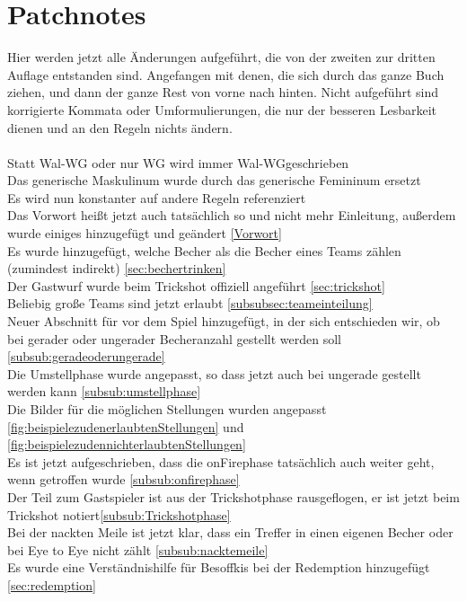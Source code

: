 \documentclass[a5paper, 12pt]{book}
\begin{document}
\chapter{Patchnotes}\label{chap:patchnotes}
Hier werden jetzt alle Änderungen aufgeführt, die von der zweiten zur dritten Auflage entstanden sind. Angefangen mit denen, die sich durch das ganze Buch ziehen, und dann der ganze Rest von vorne nach hinten. Nicht aufgeführt sind korrigierte Kommata oder Umformulierungen, die nur der besseren Lesbarkeit dienen und an den Regeln nichts ändern.\\\\
Statt Wal-WG oder nur WG wird immer Wal-WG\texttrademark geschrieben\\
Das generische Maskulinum wurde durch das generische Femininum ersetzt\\
Es wird nun konstanter auf andere Regeln referenziert\\
Das Vorwort heißt jetzt auch tatsächlich so und nicht mehr Einleitung, außerdem wurde einiges hinzugefügt und geändert \ref{Vorwort}\\
Es wurde hinzugefügt, welche Becher als die Becher eines Teams zählen (zumindest indirekt) \ref{sec:bechertrinken}\\
Der Gastwurf wurde beim Trickshot offiziell angeführt \ref{sec:trickshot}\\
Beliebig große Teams sind jetzt erlaubt \ref{subsubsec:teameinteilung}\\
Neuer Abschnitt für vor dem Spiel hinzugefügt, in der sich entschieden wir, ob bei gerader oder ungerader Becheranzahl gestellt werden soll \ref{subsub:geradeoderungerade}\\
Die Umstellphase wurde angepasst, so dass jetzt auch bei ungerade gestellt werden kann \ref{subsub:umstellphase}\\
Die Bilder für die möglichen Stellungen wurden angepasst \ref{fig:beispielezudenerlaubtenStellungen} und \ref{fig:beispielezudennichterlaubtenStellungen}\\
Es ist jetzt aufgeschrieben, dass die onFirephase tatsächlich auch weiter geht, wenn getroffen wurde \ref{subsub:onfirephase}\\
Der Teil zum Gastspieler ist aus der Trickshotphase rausgeflogen, er ist jetzt beim Trickshot notiert\ref{subsub:Trickshotphase}\\
Bei der nackten Meile ist jetzt klar, dass ein Treffer in einen eigenen Becher oder bei Eye to Eye nicht zählt \ref{subsub:nacktemeile}\\
Es wurde eine Verständnishilfe für Besoffkis bei der Redemption hinzugefügt \ref{sec:redemption}\\
\end{document}

